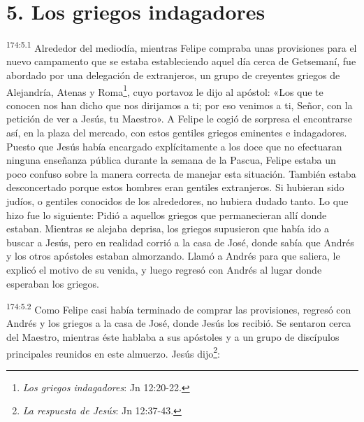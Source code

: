 \section*{5. Los griegos indagadores}
\par 
\textsuperscript{174:5.1} Alrededor del mediodía, mientras Felipe compraba unas provisiones para el nuevo campamento que se estaba estableciendo aquel día cerca de Getsemaní, fue abordado por una delegación de extranjeros, un grupo de creyentes griegos de Alejandría, Atenas y Roma\footnote{\textit{Los griegos indagadores}: Jn 12:20-22.}, cuyo portavoz le dijo al apóstol: «Los que te conocen nos han dicho que nos dirijamos a ti; por eso venimos a ti, Señor, con la petición de ver a Jesús, tu Maestro». A Felipe le cogió de sorpresa el encontrarse así, en la plaza del mercado, con estos gentiles griegos eminentes e indagadores. Puesto que Jesús había encargado explícitamente a los doce que no efectuaran ninguna enseñanza pública durante la semana de la Pascua, Felipe estaba un poco confuso sobre la manera correcta de manejar esta situación. También estaba desconcertado porque estos hombres eran gentiles extranjeros. Si hubieran sido judíos, o gentiles conocidos de los alrededores, no hubiera dudado tanto. Lo que hizo fue lo siguiente: Pidió a aquellos griegos que permanecieran allí donde estaban. Mientras se alejaba deprisa, los griegos supusieron que había ido a buscar a Jesús, pero en realidad corrió a la casa de José, donde sabía que Andrés y los otros apóstoles estaban almorzando. Llamó a Andrés para que saliera, le explicó el motivo de su venida, y luego regresó con Andrés al lugar donde esperaban los griegos.

\par 
\textsuperscript{174:5.2} Como Felipe casi había terminado de comprar las provisiones, regresó con Andrés y los griegos a la casa de José, donde Jesús los recibió. Se sentaron cerca del Maestro, mientras éste hablaba a sus apóstoles y a un grupo de discípulos principales reunidos en este almuerzo. Jesús dijo\footnote{\textit{La respuesta de Jesús}: Jn 12:37-43.}:

